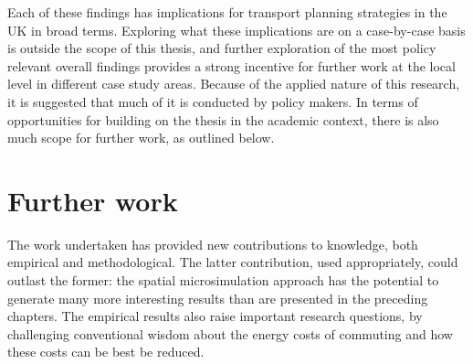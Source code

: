 \documentclass[a4paper, 11pt, twoside]{Thesis}
\begin{document}
Each of these findings has implications for transport planning strategies
in the UK in broad terms. Exploring what these implications are on a
case-by-case basis is outside the scope of this thesis, and further exploration
of the most policy relevant overall findings provides a strong
incentive for further work at the local level in different case study areas.
Because of the applied nature of this research, it is suggested that much of
it is conducted by policy makers. In terms of opportunities for
building on the thesis in the academic context, there is also much scope for further
work, as outlined below.

\section{Further work} \label{sfurther}
The work undertaken has provided new contributions to knowledge, both empirical
and methodological. The latter contribution, used appropriately,
could outlast the former: the spatial microsimulation approach has the potential
to generate many more interesting results than are presented in the preceding
chapters. The empirical results also raise important research questions, by
challenging conventional wisdom about the energy costs of commuting and how
these costs can be best be reduced.
\end{document}
